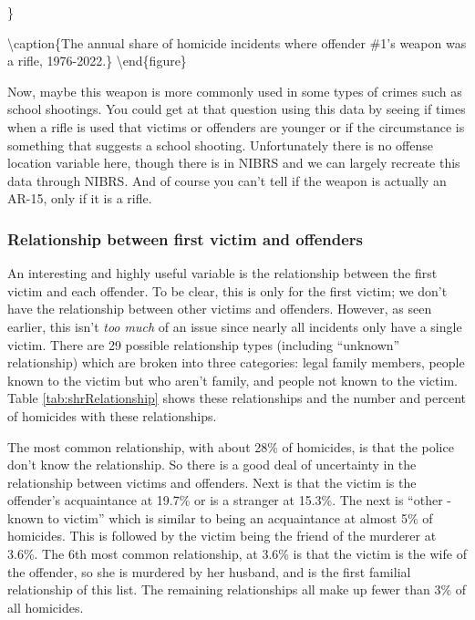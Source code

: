 \documentclass[
  12pt,
  openany]{book}
\begin{document}
\}

\textbackslash caption\{The annual share of homicide incidents where offender \#1's weapon was a rifle, 1976-2022.\}\label{fig:shrRiflePercent}
\textbackslash end\{figure\}

Now, maybe this weapon is more commonly used in some types of crimes such as school shootings. You could get at that question using this data by seeing if times when a rifle is used that victims or offenders are younger or if the circumstance is something that suggests a school shooting. Unfortunately there is no offense location variable here, though there is in NIBRS and we can largely recreate this data through NIBRS. And of course you can't tell if the weapon is actually an AR-15, only if it is a rifle.

\subsubsection{Relationship between first victim and offenders}\label{relationship-between-first-victim-and-offenders}

An interesting and highly useful variable is the relationship between the first victim and each offender. To be clear, this is only for the first victim; we don't have the relationship between other victims and offenders. However, as seen earlier, this isn't \emph{too much} of an issue since nearly all incidents only have a single victim. There are 29 possible relationship types (including ``unknown'' relationship) which are broken into three categories: legal family members, people known to the victim but who aren't family, and people not known to the victim. Table \ref{tab:shrRelationship} shows these relationships and the number and percent of homicides with these relationships.

The most common relationship, with about 28\% of homicides, is that the police don't know the relationship. So there is a good deal of uncertainty in the relationship between victims and offenders. Next is that the victim is the offender's acquaintance at 19.7\% or is a stranger at 15.3\%. The next is ``other - known to victim'' which is similar to being an acquaintance at almost 5\% of homicides. This is followed by the victim being the friend of the murderer at 3.6\%. The 6th most common relationship, at 3.6\% is that the victim is the wife of the offender, so she is murdered by her husband, and is the first familial relationship of this list. The remaining relationships all make up fewer than 3\% of all homicides.
\end{document}
